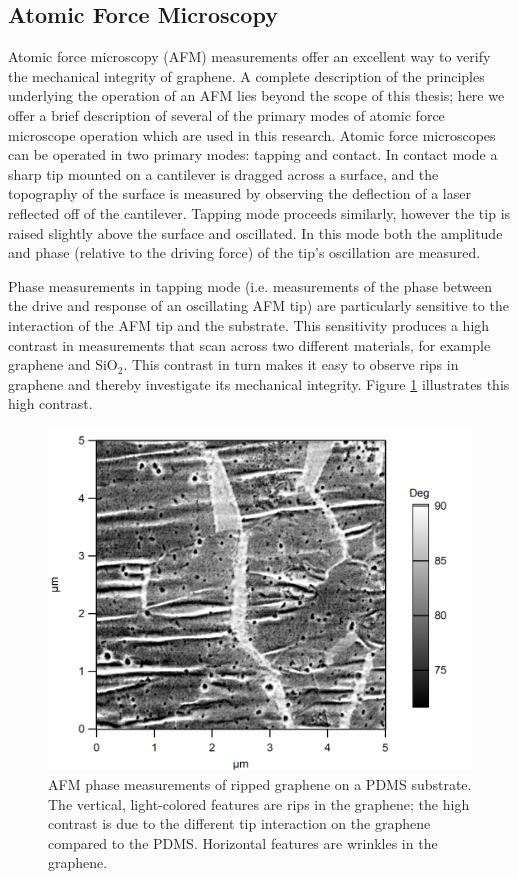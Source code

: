 \documentclass[edeposit,fullpage,draftthesis]{uiucthesis2009}
\begin{document}
        \subsection{Atomic Force Microscopy}
        
        Atomic force microscopy (AFM) measurements offer an excellent way to verify the mechanical integrity
        of graphene. A complete description of the principles underlying the operation of an AFM lies beyond
        the scope of this thesis; here we offer a brief description of several of the primary modes of 
        atomic force microscope operation which are used in this research.
        Atomic force microscopes can be operated in two primary modes: tapping and contact.
        In contact mode a sharp tip mounted on a cantilever is dragged across a surface, and the 
        topography of the surface is measured by observing the deflection of a laser reflected off of the cantilever.
        Tapping mode proceeds similarly, however the tip is raised slightly above the surface and oscillated.
        In this mode both the amplitude and phase (relative to the driving force) of the tip's oscillation are measured.
        
        Phase measurements in tapping mode (i.e. measurements of the phase between the drive
        and response of an oscillating AFM tip) are particularly sensitive to the interaction of the AFM tip and 
        the substrate. This sensitivity produces a high contrast in measurements that scan across two different materials,
        for example graphene and SiO$_2$. This contrast in turn makes it easy to observe rips in graphene
        and thereby investigate its mechanical integrity. Figure \ref{fig:afm_rips} illustrates this high contrast.
        
         \begin{figure}
            \centering
            \includegraphics[width=0.5\linewidth]{images/experimentaltechniques/AFMrips.png}
            \caption[AFM micrograph of ripped graphene]{
                AFM phase measurements of ripped graphene on a PDMS substrate. The vertical, light-colored
                features are rips in the graphene; the high contrast is due to the different tip 
                interaction on the graphene compared to the PDMS. Horizontal features are wrinkles
                in the graphene.
                }
            \label{fig:afm_rips}
        \end{figure}
       
\end{document}
